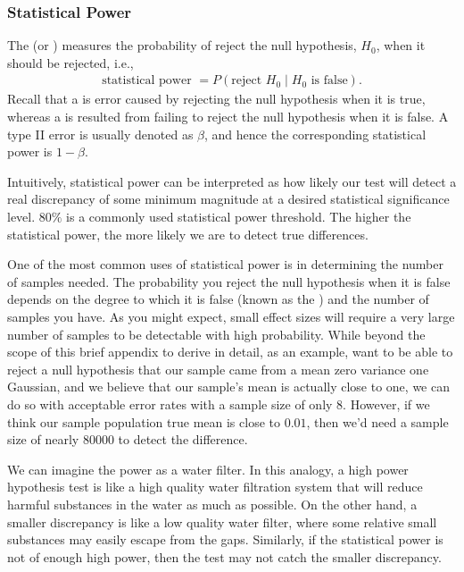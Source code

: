 \documentclass[letterpaper,11pt,english]{sphinxmanual}
\begin{document}
\subsubsection{Statistical Power}
\label{\detokenize{chapter_appendix_math/statistics:statistical-power}}
The  (or ) measures the probability of
reject the null hypothesis, \(H_0\), when it should be rejected,
i.e.,
\begin{equation}\label{equation:chapter_appendix_math/statistics:chapter_appendix_math/statistics:2}
\begin{split}\text{statistical power }= P(\text{reject } H_0  \mid H_0 \text{ is false} ).\end{split}
\end{equation}
Recall that a  is error caused by rejecting the null
hypothesis when it is true, whereas a  is resulted from
failing to reject the null hypothesis when it is false. A type II error
is usually denoted as \(\beta\), and hence the corresponding
statistical power is \(1-\beta\).

Intuitively, statistical power can be interpreted as how likely our test
will detect a real discrepancy of some minimum magnitude at a desired
statistical significance level. \(80\%\) is a commonly used
statistical power threshold. The higher the statistical power, the more
likely we are to detect true differences.

One of the most common uses of statistical power is in determining the
number of samples needed. The probability you reject the null hypothesis
when it is false depends on the degree to which it is false (known as
the ) and the number of samples you have. As you might
expect, small effect sizes will require a very large number of samples
to be detectable with high probability. While beyond the scope of this
brief appendix to derive in detail, as an example, want to be able to
reject a null hypothesis that our sample came from a mean zero variance
one Gaussian, and we believe that our sample’s mean is actually close to
one, we can do so with acceptable error rates with a sample size of only
\(8\). However, if we think our sample population true mean is close
to \(0.01\), then we’d need a sample size of nearly \(80000\) to
detect the difference.

We can imagine the power as a water filter. In this analogy, a high
power hypothesis test is like a high quality water filtration system
that will reduce harmful substances in the water as much as possible. On
the other hand, a smaller discrepancy is like a low quality water
filter, where some relative small substances may easily escape from the
gaps. Similarly, if the statistical power is not of enough high power,
then the test may not catch the smaller discrepancy.
\end{document}
